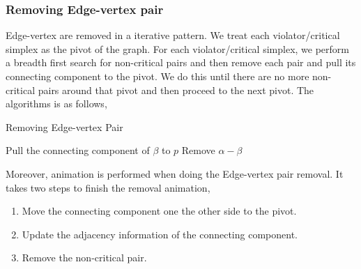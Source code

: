 \documentclass[12pt]{article}
\begin{document}
\subsubsection{Removing Edge-vertex pair}
Edge-vertex are removed in a iterative pattern. We treat each violator/critical simplex as the pivot of the graph. For each violator/critical simplex, we perform a breadth first search for non-critical pairs and then remove each pair and pull its connecting component to the pivot. We do this until there are no more non-critical pairs around that pivot and then proceed to the next pivot. The algorithms is as follows,

\begin{algorithm}
	\caption{Removing Edge-vertex Pair}\label{v4}
	\begin{algorithmic}[0]
	        \Repeat{}
	                \State Pull the connecting component of $\beta$ to $p$
	                \State Remove $\alpha - \beta$
	            \EndIf
	        \EndFor
	        \State 
	    \EndFor
		\EndFunction
	\end{algorithmic}
\end{algorithm}

Moreover, animation is performed when doing the Edge-vertex pair removal. It takes two steps to finish the removal animation,
\begin{enumerate}
    \item Move the connecting component one the other side to the pivot.
    \item Update the adjacency information of the connecting component.
    \item Remove the non-critical pair.
\end{enumerate}
\end{document}
